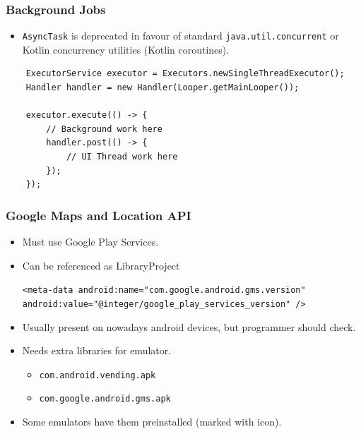 \documentclass[10pt,xcolor=pdflatex]{beamer}
\begin{document}
\begin{frame}[fragile]\frametitle{Background Jobs}
\begin{itemize}
	\item \texttt{AsyncTask} is deprecated in favour of  standard \texttt{java.util.concurrent} or Kotlin concurrency utilities (Kotlin coroutines).
\end{itemize}
{\footnotesize 
\begin{lstlisting}
    ExecutorService executor = Executors.newSingleThreadExecutor();
    Handler handler = new Handler(Looper.getMainLooper());

    executor.execute(() -> {
        // Background work here
        handler.post(() -> {
            // UI Thread work here
        });
    });
\end{lstlisting}
}
\end{frame}




\begin{frame}[fragile]\frametitle{Google Maps and Location API}
\begin{itemize}
	\item Must use Google Play Services.
   	\item Can be referenced as LibraryProject\newline \begin{footnotesize}
   	\verb;<meta-data android:name="com.google.android.gms.version";\newline
\verb;android:value="@integer/google_play_services_version" />;\end{footnotesize}	
	\item Usually present on nowadays android devices, but programmer should check.
	\item Needs extra libraries for emulator.
	  \begin{itemize}
		\item \texttt{com.android.vending.apk}
		\item \texttt{com.google.android.gms.apk}
	  \end{itemize}
    \item Some emulators have them preinstalled (marked with icon).
\end{itemize}
\end{frame}
\end{document}
